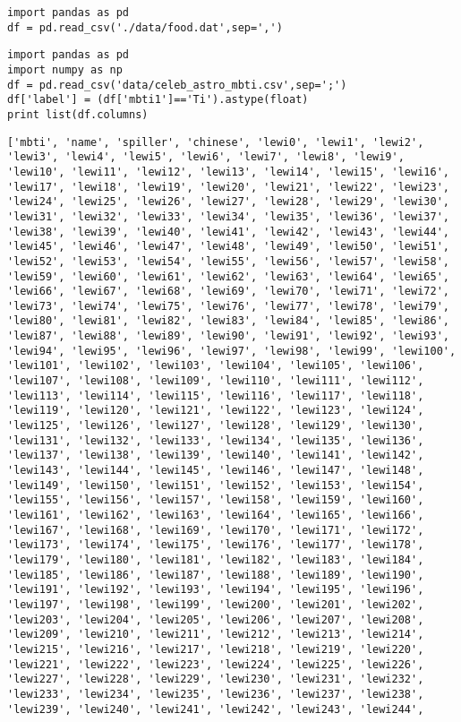\documentclass[12pt,fleqn]{article}\usepackage{../common}
\begin{document}
\begin{verbatim}
import pandas as pd
df = pd.read_csv('./data/food.dat',sep=',')
\end{verbatim}


\begin{verbatim}
import pandas as pd
import numpy as np
df = pd.read_csv('data/celeb_astro_mbti.csv',sep=';')
df['label'] = (df['mbti1']=='Ti').astype(float)
print list(df.columns)
\end{verbatim}

\begin{verbatim}
['mbti', 'name', 'spiller', 'chinese', 'lewi0', 'lewi1', 'lewi2', 'lewi3', 'lewi4', 'lewi5', 'lewi6', 'lewi7', 'lewi8', 'lewi9', 'lewi10', 'lewi11', 'lewi12', 'lewi13', 'lewi14', 'lewi15', 'lewi16', 'lewi17', 'lewi18', 'lewi19', 'lewi20', 'lewi21', 'lewi22', 'lewi23', 'lewi24', 'lewi25', 'lewi26', 'lewi27', 'lewi28', 'lewi29', 'lewi30', 'lewi31', 'lewi32', 'lewi33', 'lewi34', 'lewi35', 'lewi36', 'lewi37', 'lewi38', 'lewi39', 'lewi40', 'lewi41', 'lewi42', 'lewi43', 'lewi44', 'lewi45', 'lewi46', 'lewi47', 'lewi48', 'lewi49', 'lewi50', 'lewi51', 'lewi52', 'lewi53', 'lewi54', 'lewi55', 'lewi56', 'lewi57', 'lewi58', 'lewi59', 'lewi60', 'lewi61', 'lewi62', 'lewi63', 'lewi64', 'lewi65', 'lewi66', 'lewi67', 'lewi68', 'lewi69', 'lewi70', 'lewi71', 'lewi72', 'lewi73', 'lewi74', 'lewi75', 'lewi76', 'lewi77', 'lewi78', 'lewi79', 'lewi80', 'lewi81', 'lewi82', 'lewi83', 'lewi84', 'lewi85', 'lewi86', 'lewi87', 'lewi88', 'lewi89', 'lewi90', 'lewi91', 'lewi92', 'lewi93', 'lewi94', 'lewi95', 'lewi96', 'lewi97', 'lewi98', 'lewi99', 'lewi100', 'lewi101', 'lewi102', 'lewi103', 'lewi104', 'lewi105', 'lewi106', 'lewi107', 'lewi108', 'lewi109', 'lewi110', 'lewi111', 'lewi112', 'lewi113', 'lewi114', 'lewi115', 'lewi116', 'lewi117', 'lewi118', 'lewi119', 'lewi120', 'lewi121', 'lewi122', 'lewi123', 'lewi124', 'lewi125', 'lewi126', 'lewi127', 'lewi128', 'lewi129', 'lewi130', 'lewi131', 'lewi132', 'lewi133', 'lewi134', 'lewi135', 'lewi136', 'lewi137', 'lewi138', 'lewi139', 'lewi140', 'lewi141', 'lewi142', 'lewi143', 'lewi144', 'lewi145', 'lewi146', 'lewi147', 'lewi148', 'lewi149', 'lewi150', 'lewi151', 'lewi152', 'lewi153', 'lewi154', 'lewi155', 'lewi156', 'lewi157', 'lewi158', 'lewi159', 'lewi160', 'lewi161', 'lewi162', 'lewi163', 'lewi164', 'lewi165', 'lewi166', 'lewi167', 'lewi168', 'lewi169', 'lewi170', 'lewi171', 'lewi172', 'lewi173', 'lewi174', 'lewi175', 'lewi176', 'lewi177', 'lewi178', 'lewi179', 'lewi180', 'lewi181', 'lewi182', 'lewi183', 'lewi184', 'lewi185', 'lewi186', 'lewi187', 'lewi188', 'lewi189', 'lewi190', 'lewi191', 'lewi192', 'lewi193', 'lewi194', 'lewi195', 'lewi196', 'lewi197', 'lewi198', 'lewi199', 'lewi200', 'lewi201', 'lewi202', 'lewi203', 'lewi204', 'lewi205', 'lewi206', 'lewi207', 'lewi208', 'lewi209', 'lewi210', 'lewi211', 'lewi212', 'lewi213', 'lewi214', 'lewi215', 'lewi216', 'lewi217', 'lewi218', 'lewi219', 'lewi220', 'lewi221', 'lewi222', 'lewi223', 'lewi224', 'lewi225', 'lewi226', 'lewi227', 'lewi228', 'lewi229', 'lewi230', 'lewi231', 'lewi232', 'lewi233', 'lewi234', 'lewi235', 'lewi236', 'lewi237', 'lewi238', 'lewi239', 'lewi240', 'lewi241', 'lewi242', 'lewi243', 'lewi244', 
\end{verbatim}
\end{document}
